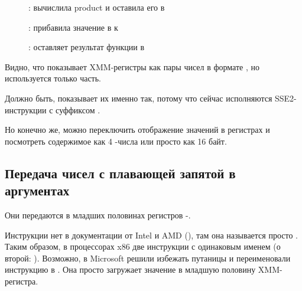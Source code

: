 \clearpage
\begin{figure}[H]
\centering
{}
\caption{\olly:  вычислила \gls{product} и оставила его в }
\label{fig:FPU_SIMD_simple_olly3}
\end{figure}

\clearpage
\begin{figure}[H]
\centering
{}
\caption{\olly:  прибавила значение в  к }
\label{fig:FPU_SIMD_simple_olly4}
\end{figure}

\clearpage
\begin{figure}[H]
\centering
{}
\caption{\olly: \FLD оставляет результат функции в }
\label{fig:FPU_SIMD_simple_olly5}
\end{figure}

Видно, что \olly показывает XMM-регистры как пары чисел в формате \Tdouble,
но используется только  часть.

Должно быть, \olly показывает их именно так, потому что сейчас исполняются SSE2-инструкции
с суффиксом .

Но конечно же, можно переключить отображение значений в регистрах и посмотреть содержимое
как 4 \Tfloat{}-числа или просто как 16 байт.

\clearpage
\subsection{Передача чисел с плавающей запятой в аргументах}



Они передаются в младших половинах регистров -.



Инструкции  нет в документации от Intel и AMD  (), там она называется просто .
Таким образом, в процессорах x86 две инструкции с одинаковым именем (о второй: ).
Возможно, в Microsoft решили избежать путаницы и переименовали инструкцию в .
Она просто загружает значение в младшую половину XMM-регистра.

